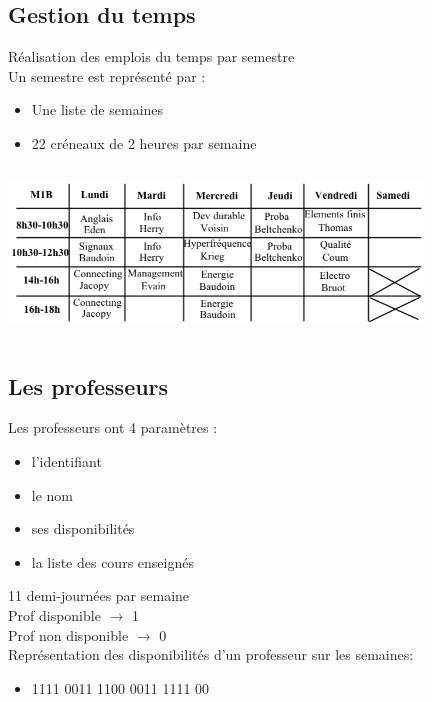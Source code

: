 \documentclass{beamer}
\begin{document}
\subsection{Gestion du temps}
\begin{frame}
Réalisation des emplois du temps par semestre\\
\vspace{\baselineskip}
Un semestre est représenté par :
\begin{itemize}
\item Une liste de semaines
\item 22 créneaux de 2 heures par semaine
\end{itemize}
\end{frame}

\begin{frame}
\begin{center}
\includegraphics [width=110mm, height=45mm]{Dessin2.png}
\end{center}
\end{frame}

\subsection{Les professeurs}
\begin{frame} 
Les professeurs ont 4 paramètres : 
\begin{itemize}
\item l'identifiant
\item le nom
\item ses disponibilités
\item la liste des cours enseignés
\end{itemize}
\end{frame}

\begin{frame}
11 demi-journées par semaine\\

Prof disponible  $\rightarrow$ 1\\
Prof non disponible  $\rightarrow$ 0\\
\vspace{\baselineskip}
Représentation des disponibilités d'un professeur sur les semaines:
\begin{itemize}
\item 1111 0011 1100 0011 1111 00
\end{itemize}
\end{frame}
\end{document}
